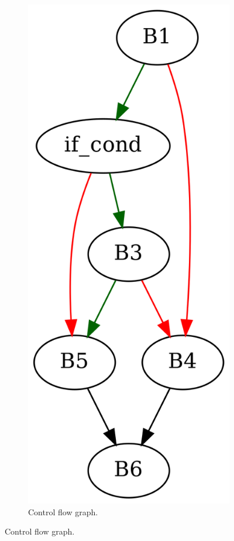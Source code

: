 \documentclass[aspectratio=1610]{beamer}
\begin{document}
\begin{frame}
\begin{figure}[htbp]
\begin{subfigure}[b]{0.50\textwidth}
			\includegraphics[height=0.5\paperheight]{inc/methods/interval/counter-example/bool_propagation_jump/f.png}
			\caption{Control flow graph.}
		\end{subfigure}
	\end{figure}
\end{frame}
\end{document}
